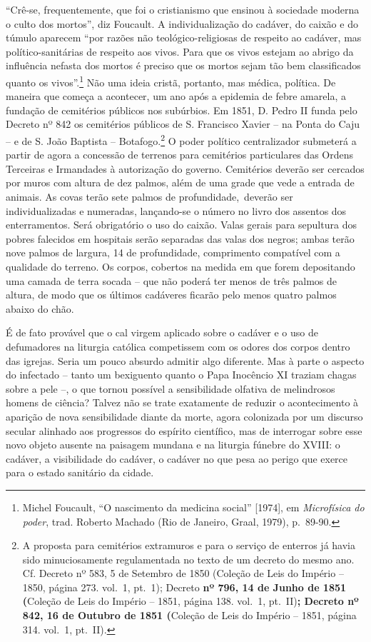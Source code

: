 ``Crê-se, frequentemente, que foi o cristianismo que ensinou à sociedade
moderna o culto dos mortos'', diz Foucault. A individualização do
cadáver, do caixão e do túmulo aparecem ``por razões não
teológico-religiosas de respeito ao cadáver, mas político-sanitárias de
respeito aos vivos. Para que os vivos estejam ao abrigo da influência
nefasta dos mortos é preciso que os mortos sejam tão bem classificados
quanto os vivos''.\footnote{Michel Foucault, ``O nascimento da medicina
  social'' {[}1974{]}, em \emph{Microfísica do poder}, trad. Roberto
  Machado (Rio de Janeiro, Graal, 1979), p.~89-90.} Não uma ideia
cristã, portanto, mas médica, política. De maneira que começa a
acontecer, um ano após a epidemia de febre amarela, a fundação de
cemitérios públicos nos subúrbios. Em 1851, D. Pedro II funda pelo
Decreto nº 842 os cemitérios públicos de S. Francisco Xavier -- na Ponta
do Caju -- e de S. João Baptista -- Botafogo.\footnote{A proposta para
  cemitérios extramuros e para o serviço de enterros já havia sido
  minuciosamente regulamentada no texto de um decreto do mesmo ano. Cf.
  Decreto nº 583, 5 de Setembro de 1850 (Coleção de Leis do Império --
  1850, página 273. vol.~1, pt.~1); Decreto \textbf{nº 796, 14 de Junho
  de 1851 (}Coleção de Leis do Império -- 1851, página 138. vol.~1,
  pt.~II)\textbf{; Decreto nº 842, 16 de Outubro de 1851 (}Coleção de
  Leis do Império -- 1851, página 314. vol.~1, pt.~II).} O poder
político centralizador submeterá a partir de agora a concessão de
terrenos para cemitérios particulares das Ordens Terceiras e Irmandades
à autorização do governo. Cemitérios deverão ser cercados por muros com
altura de dez palmos, além de uma grade que vede a entrada de animais.
As covas terão sete palmos de profundidade,~deverão ser individualizadas
e numeradas, lançando-se o número no livro dos assentos dos
enterramentos. Será obrigatório o uso do caixão. Valas gerais para
sepultura dos pobres falecidos em hospitais serão separadas das valas
dos negros; ambas terão nove palmos de largura, 14 de profundidade,
comprimento compatível com a qualidade do terreno. Os corpos, cobertos
na medida em que forem depositando uma camada de terra socada -- que não
poderá ter menos de três palmos de altura, de modo que os últimos
cadáveres ficarão pelo menos quatro palmos abaixo do chão.

É de fato provável que o cal virgem aplicado sobre o cadáver e o uso de
defumadores na liturgia católica competissem com os odores dos corpos
dentro das igrejas. Seria um pouco absurdo admitir algo diferente. Mas à
parte o aspecto do infectado -- tanto um bexiguento quanto o Papa
Inocêncio XI traziam chagas sobre a pele --, o que tornou possível a
sensibilidade olfativa de melindrosos homens de ciência? Talvez não se
trate exatamente de reduzir o acontecimento à aparição de nova
sensibilidade diante da morte, agora colonizada por um discurso secular
alinhado aos progressos do espírito científico, mas de interrogar sobre
esse novo objeto ausente na paisagem mundana e na liturgia fúnebre do
XVIII: o cadáver, a visibilidade do cadáver, o cadáver no que pesa ao
perigo que exerce para o estado sanitário da cidade.

